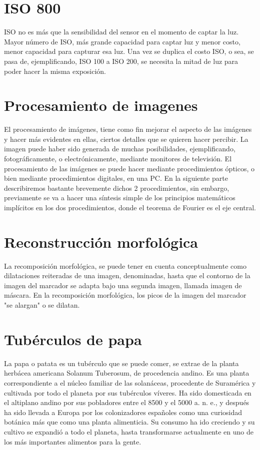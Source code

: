 	\section{ISO 800} ISO no es más que la sensibilidad del sensor en el momento de captar la luz. Mayor número de ISO, más grande capacidad para captar luz y menor costo, menor capacidad para capturar esa luz. Una vez se duplica el costo ISO, o sea, se pasa de, ejemplificando, ISO 100 a ISO 200, se necesita la mitad de luz para poder hacer la misma exposición.
	\\ 
	
	\section{Procesamiento de imagenes} El procesamiento de imágenes, tiene como fin mejorar el aspecto de las imágenes y hacer más evidentes en ellas, ciertos detalles que se quieren hacer percibir. La imagen puede haber sido generada de muchas posibilidades, ejemplificando, fotográficamente, o electrónicamente, mediante monitores de televisión. El procesamiento de las imágenes se puede hacer mediante procedimientos ópticos, o bien mediante procedimientos digitales, en una PC. En la siguiente parte describiremos bastante brevemente dichos 2 procedimientos, sin embargo, previamente se va a hacer una síntesis simple de los principios matemáticos implícitos en los dos procedimientos, donde el teorema de Fourier es el eje central.
	\\ 
	
	\section{Reconstrucción morfológica} La recomposición morfológica, se puede tener en cuenta conceptualmente como dilataciones reiteradas de una imagen, denominadas, hasta que el contorno de la imagen del marcador se adapta bajo una segunda imagen, llamada imagen de máscara. En la recomposición morfológica, los picos de la imagen del marcador "se alargan"  o se dilatan.
	\\ 
	
	\section{Tubérculos de papa} La papa o patata es un tubérculo que se puede comer, se extrae de la planta herbácea americana Solanum Tuberosum, de procedencia andino. Es una planta correspondiente a el núcleo familiar de las solanáceas, procedente de Suramérica y cultivada por todo el planeta por sus tubérculos víveres. Ha sido domesticada en el altiplano andino por sus pobladores entre el 8500 y el 5000 a. n. e., y después ha sido llevada a Europa por los colonizadores españoles como una curiosidad botánica más que como una planta alimenticia. Su consumo ha ido creciendo y su cultivo se expandió a todo el planeta, hasta transformarse actualmente en uno de los más importantes alimentos para la gente.
	\\ 
	
